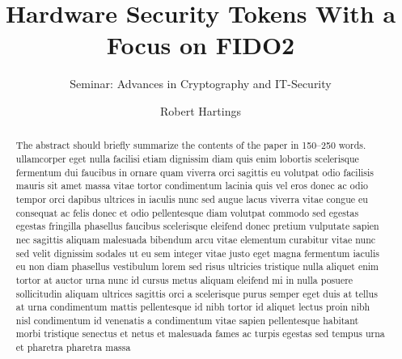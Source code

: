 \documentclass[runningheads]{llncs}
\begin{document}
%
\title{Hardware Security Tokens With a Focus on FIDO2}
\subtitle{Seminar: Advances in Cryptography and IT-Security}
%
%

\author{Robert Hartings}

%
\maketitle              %
%
\begin{abstract}
The abstract should briefly summarize the contents of the paper in
150--250 words. ullamcorper eget nulla facilisi etiam dignissim diam quis enim lobortis scelerisque fermentum dui faucibus in ornare quam viverra orci sagittis eu volutpat odio facilisis mauris sit amet massa vitae tortor condimentum lacinia quis vel eros donec ac odio tempor orci dapibus ultrices in iaculis nunc sed augue lacus viverra vitae congue eu consequat ac felis donec et odio pellentesque diam volutpat commodo sed egestas egestas fringilla phasellus faucibus scelerisque eleifend donec pretium vulputate sapien nec sagittis aliquam malesuada bibendum arcu vitae elementum curabitur vitae nunc sed velit dignissim sodales ut eu sem integer vitae justo eget magna fermentum iaculis eu non diam phasellus vestibulum lorem sed risus ultricies tristique nulla aliquet enim tortor at auctor urna nunc id cursus metus aliquam eleifend mi in nulla posuere sollicitudin aliquam ultrices sagittis orci a scelerisque purus semper eget duis at tellus at urna condimentum mattis pellentesque id nibh tortor id aliquet lectus proin nibh nisl condimentum id venenatis a condimentum vitae sapien pellentesque habitant morbi tristique senectus et netus et malesuada fames ac turpis egestas sed tempus urna et pharetra pharetra massa

\end{abstract}
%
%
%
\end{document}
